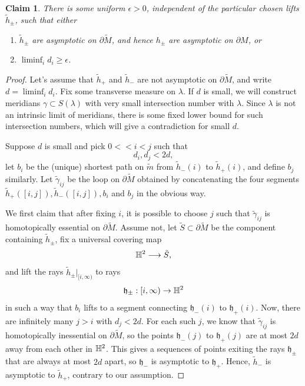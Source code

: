 \documentclass[12pt]{amsart}
\newtheorem{claim}[theorem]{Claim}
\theoremstyle{definition}
\theoremstyle{remark}
\begin{document}
\medskip

\begin{claim}\label{case1}
There is some  uniform $\epsilon>0$,  independent of the particular chosen lifts $\tilde h_\pm$, such that either
\begin{enumerate}
	\item $\tilde h_\pm$ are asymptotic on $\partial \tilde M$, and hence $h_\pm$ are asymptotic on $\partial M$, or
\item $\liminf_i d_i \geq \epsilon$.
\end{enumerate}
\end{claim}
\begin{proof}
	Let's  assume that $\tilde h_+$ and $\tilde h_-$ are not asymptotic on $\partial \tilde M$, and write $d = \liminf_i d_i $. Fix some transverse measure on $\lambda$. If $d$ is small, we will construct meridians $\gamma \subset S(\lambda)$ with very small intersection number with $\lambda$. Since $\lambda$ is not an intrinsic limit of meridians, there is some fixed lower bound for such intersection numbers, which will give a contradiction for small $d$.

Suppose $d$ is small and pick $0<<i<j$  such that $$d_i,d_j < 2d,$$
 let $b_i$ be the (unique) shortest path on $\tilde m$ from $\tilde h_-(i)$ to $\tilde h_+(i)$, and define $b_j$ similarly. Let $\tilde  \gamma_{ij}$ be the loop on $\partial \tilde M$ obtained by concatenating  the four segments $\tilde h_+([i,j]), \tilde h_-([i,j]), b_i $ and $b_j$ in the obvious way. 

 We first claim that after fixing $i$, it is possible to choose $j$ such that $\tilde \gamma_{ij}$ is homotopically essential on $\partial \tilde M$.  Assume not, let $\tilde S \subset \partial \tilde M$ be the component containing $\tilde h_\pm$, fix a universal covering map $$\mathbb H^2 \longrightarrow \tilde S,$$ and lift the rays $\tilde h_\pm |_{[i,\infty)}$  to rays $$\mathfrak h_\pm : [i,\infty) \to \mathbb H^2$$ in such a way that $b_i$ lifts to a segment connecting $\mathfrak h_-(i)$ to $\mathfrak h_+(i)$. Now, there are infinitely many $j>i$ with $d_j<2d$. For each such $j$, we know that $\tilde \gamma_{ij}$ is homotopically inessential on $\partial \tilde M$, so the points $\mathfrak h_-(j)$ to $\mathfrak h_+(j)$ are at most $2d$ away from each other in $\mathbb H^2$. This gives a sequences of points exiting the rays $\mathfrak h_\pm$ that are always at most $2d$ apart, so $\mathfrak h_-$ is asymptotic to $\mathfrak h_+$. Hence, $\tilde h_-$ is asymptotic to $\tilde h_+$, contrary to our assumption.


\end{proof}
\end{document}
